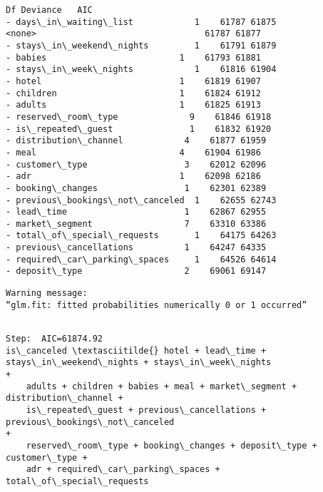 \documentclass[11pt]{article}
\begin{document}
    \begin{Verbatim}[commandchars=\\\{\}]
                                 Df Deviance   AIC
- days\_in\_waiting\_list            1    61787 61875
<none>                                 61787 61877
- stays\_in\_weekend\_nights         1    61791 61879
- babies                          1    61793 61881
- stays\_in\_week\_nights            1    61816 61904
- hotel                           1    61819 61907
- children                        1    61824 61912
- adults                          1    61825 61913
- reserved\_room\_type              9    61846 61918
- is\_repeated\_guest               1    61832 61920
- distribution\_channel            4    61877 61959
- meal                            4    61904 61986
- customer\_type                   3    62012 62096
- adr                             1    62098 62186
- booking\_changes                 1    62301 62389
- previous\_bookings\_not\_canceled  1    62655 62743
- lead\_time                       1    62867 62955
- market\_segment                  7    63310 63386
- total\_of\_special\_requests       1    64175 64263
- previous\_cancellations          1    64247 64335
- required\_car\_parking\_spaces     1    64526 64614
- deposit\_type                    2    69061 69147
    \end{Verbatim}

    \begin{Verbatim}[commandchars=\\\{\}]
Warning message:
“glm.fit: fitted probabilities numerically 0 or 1 occurred”
    \end{Verbatim}

    \begin{Verbatim}[commandchars=\\\{\}]

Step:  AIC=61874.92
is\_canceled \textasciitilde{} hotel + lead\_time + stays\_in\_weekend\_nights + stays\_in\_week\_nights
+
    adults + children + babies + meal + market\_segment + distribution\_channel +
    is\_repeated\_guest + previous\_cancellations + previous\_bookings\_not\_canceled
+
    reserved\_room\_type + booking\_changes + deposit\_type + customer\_type +
    adr + required\_car\_parking\_spaces + total\_of\_special\_requests

    \end{Verbatim}
\end{document}
